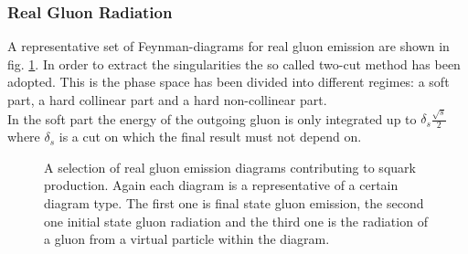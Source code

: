 \subsubsection{Real Gluon Radiation}
A representative set of Feynman-diagrams for real gluon emission are shown in fig. \ref{fig:RealGluon}. In order to extract the singularities the so called two-cut method has been adopted. This is the phase space has been divided into different regimes: a soft part, a hard collinear part and a hard non-collinear part.\\
In the soft part the energy of the outgoing gluon is only integrated up to  $\delta_s \frac{\sqrt{s}}{2}$ where $\delta_s$ is a cut on which the final result must not depend on.
\begin{figure}[!htbp]
\begin{center}
\caption{A selection of real gluon emission diagrams contributing to squark production. Again each diagram is a representative of a certain diagram type. The first one is final state gluon emission, the second one initial state gluon radiation and the third one is the radiation of a gluon from a virtual particle within the diagram.}\label{fig:RealGluon}
\end{center}
\end{figure}


